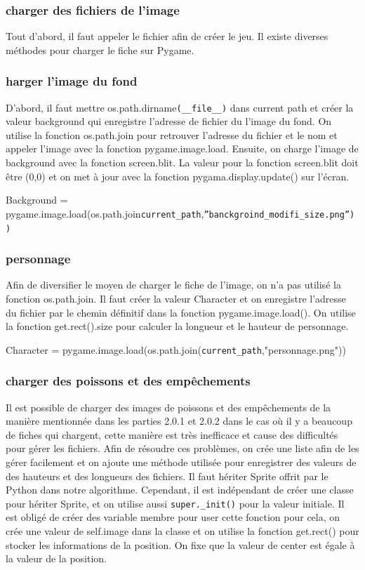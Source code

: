 \documentclass{article}
\begin{document}
\subsubsection{charger des fichiers de l'image}
Tout d’abord, il faut appeler le fichier afin de créer le jeu. Il existe diverses méthodes pour charger le fiche sur Pygame.
\subsubsection{harger l’image du fond}
D’abord, il faut mettre os.path.dirname\verb|(__file__)|  dans current path et créer la valeur background qui enregistre l’adresse de fichier du l’image du fond. On utilise la fonction os.path.join pour retrouver l’adresse du fichier et le nom et appeler l’image avec la fonction pygame.image.load. Ensuite, on charge l’image de background avec la fonction screen.blit. La valeur pour la fonction screen.blit doit être (0,0) et on met à jour avec la fonction pygama.display.update() sur l’écran.\newline

Background = pygame.image.load(os.path.join\verb|current_path|,\verb|”banckgroind_modifi_size.png”))|

\subsubsection{personnage}
Afin de diversifier le moyen de charger le fiche de l’image, on n’a pas utilisé la fonction os.path.join.  Il faut créer la valeur Character et on enregistre l’adresse du fichier par le chemin définitif dans la fonction pygame.image.load(). On utilise la fonction get.rect().size pour calculer la longueur et le hauteur de personnage.\newline

Character = pygame.image.load(os.path.join(\verb|current_path|,"personnage.png"))
\subsubsection{ charger des poissons et des empêchements}
Il est possible de charger des images de poissons et des empêchements de la manière mentionnée dans les parties 2.0.1 et 2.0.2 dans le cas où il y a beaucoup de fiches qui chargent, cette manière est très inefficace et cause des difficultés pour gérer les fichiers. Afin de résoudre ces problèmes, on crée une liste afin de les gérer facilement et on ajoute une méthode utilisée pour enregistrer des valeurs de des hauteurs et des longueurs des fichiers. Il faut hériter Sprite offrit par le Python dans notre algorithme. Cependant, il est indépendant de créer une classe pour hériter Sprite, et on utilise aussi \verb|super._init()| pour la valeur initiale. Il est obligé de créer des variable membre pour user cette fonction pour cela, on crée une valeur de self.image dans la classe et on utilise la fonction get.rect() pour stocker les informations de la position. On fixe que la valeur de center est égale à la valeur de la position.
\end{document}
